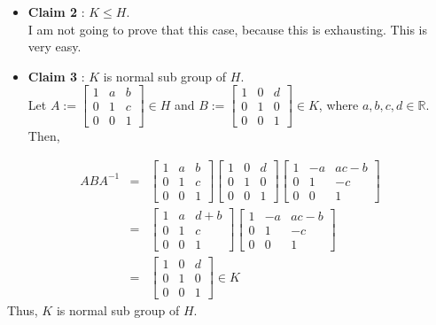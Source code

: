 \documentclass[
]{book}
\theoremstyle{definition}
\theoremstyle{definition}
\theoremstyle{definition}
\theoremstyle{definition}
\theoremstyle{remark}
\begin{document}
\begin{itemize}
\item
  \textbf{Claim 2} : \(K\leq H\).\\
  I am not going to prove that this case, because this is exhausting. This is very easy.
\item
  \textbf{Claim 3} : \(K\) is normal sub group of \(H\).\\
  Let \(A:=\begin{bmatrix} 1 & a & b \\0 & 1 & c\\ 0 & 0 & 1\end{bmatrix}\in H\) and \(B:=\begin{bmatrix} 1 & 0 & d \\0 & 1 & 0\\ 0 & 0 & 1\end{bmatrix}\in K\), where \(a,b,c,d\in \mathbb{R}\).
  Then,
\end{itemize}

\begin{eqnarray}
ABA^{-1}& =& \begin{bmatrix} 1 & a & b \\0 & 1 & c\\ 0 & 0  & 1\end{bmatrix}
\begin{bmatrix} 1 & 0 & d \\0 & 1 & 0\\ 0 & 0  & 1\end{bmatrix}
\begin{bmatrix} 1 & -a & ac-b \\ 0 & 1 & -c \\ 0 & 0 & 1 \end{bmatrix} \\
&=&\begin{bmatrix} 1 & a & d+b \\0 & 1 & c\\ 0 & 0  & 1\end{bmatrix}
\begin{bmatrix} 1 & -a & ac-b \\ 0 & 1 & -c \\ 0 & 0 & 1 \end{bmatrix} \\ 
&=& \begin{bmatrix} 1 & 0 & d \\0 & 1 & 0\\ 0 & 0  & 1\end{bmatrix}\in K
\end{eqnarray}
Thus, \(K\) is normal sub group of \(H\).
\end{document}
